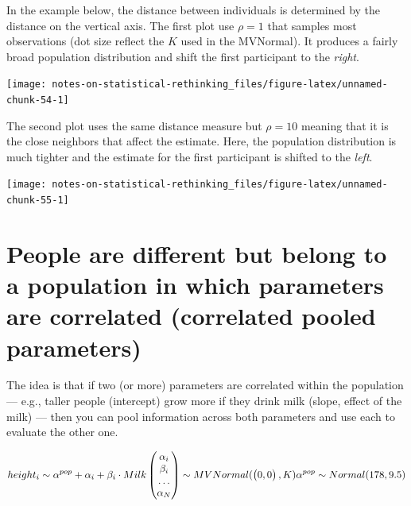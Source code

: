 \documentclass[
]{book}
\begin{document}
In the example below, the distance between individuals is determined by the distance on the vertical axis. The first plot use \(\rho=1\) that samples most observations (dot size reflect the \(K\) used in the MVNormal). It produces a fairly broad population distribution and shift the first participant to the \emph{right}.

\begin{center}\texttt{[image: notes-on-statistical-rethinking\_files/figure-latex/unnamed-chunk-54-1]} \end{center}

The second plot uses the same distance measure but \(\rho=10\) meaning that it is the close neighbors that affect the estimate. Here, the population distribution is much tighter and the estimate for the first participant is shifted to the \emph{left}.

\begin{center}\texttt{[image: notes-on-statistical-rethinking\_files/figure-latex/unnamed-chunk-55-1]} \end{center}

\hypertarget{people-are-different-but-belong-to-a-population-in-which-parameters-are-correlated-correlated-pooled-parameters}{%
\section{People are different but belong to a population in which parameters are correlated (correlated pooled parameters)}\label{people-are-different-but-belong-to-a-population-in-which-parameters-are-correlated-correlated-pooled-parameters}}

The idea is that if two (or more) parameters are correlated within the population --- e.g., taller people (intercept) grow more if they drink milk (slope, effect of the milk) --- then you can pool information across both parameters and use each to evaluate the other one.

\[height_i \sim \alpha^{pop} + \alpha_i + \beta_i \cdot Milk\\
\begin{pmatrix} \alpha_i \\ \beta_i \\ \dots \\ \alpha_N \end{pmatrix} \sim MVNormal(
 \begin{pmatrix}0, 0 \end{pmatrix}, K) \\
\alpha^{pop} \sim Normal(178, 9.5)\]
\end{document}
